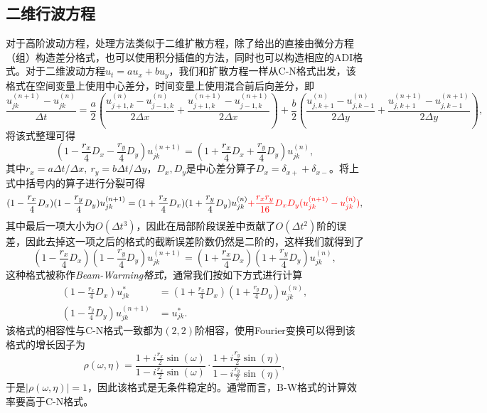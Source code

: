 \documentclass[a4paper,10pt]{ctexart}
\begin{document}
\subsection{二维行波方程}
对于高阶波动方程，处理方法类似于二维扩散方程，除了给出的直接由微分方程（组）构造差分格式，也可以使用积分插值的方法，同时也可以构造相应的ADI格式。对于二维波动方程$ u_{t} = au_{x} + bu_{y} $，我们和扩散方程一样从C-N格式出发，该格式在空间变量上使用中心差分，时间变量上使用混合前后向差分，即
\[
    \frac{u^{(n+1)}_{jk} - u^{(n)}_{jk}}{\Delta t} = \frac{a}{2} \left( \frac{u^{(n)}_{j+1,k}-u^{(n)}_{j-1,k}}{2\Delta x} + \frac{u^{(n+1)}_{j+1,k}-u^{(n+1)}_{j-1,k}}{2\Delta x}\right) + \frac{b}{2} \left( \frac{u^{(n)}_{j,k+1}-u^{(n)}_{j,k-1}}{2\Delta y} + \frac{u^{(n+1)}_{j,k+1}-u^{(n+1)}_{j,k-1}}{2\Delta y}\right),
\]
将该式整理可得
\begin{equation}
    (1 - \frac{r_x}{4}D_x-\frac{r_y}{4}D_y)u^{(n+1)}_{jk} = (1 + \frac{r_x}{4}D_x+\frac{r_y}{4}D_y)u^{(n)}_{jk},
\end{equation}
其中$ r_x = a \Delta t / \Delta x,\ r_y = b \Delta t / \Delta y $，$ D_x,D_y $是中心差分算子$ D_x = \delta_{x+}+\delta_{x-} $。将上式中括号内的算子进行分裂可得
\begin{equation}
    (1-\frac{r_x}{4}D_x)(1-\frac{r_y}{4}D_y)u^{(n+1)}_{jk} = (1+\frac{r_x}{4}D_x)(1+\frac{r_y}{4}D_y)u^{(n)}_{jk} \textcolor{red}{+ \frac{r_x r_y}{16}D_xD_y (u^{(n+1)}_{jk}-u^{(n)}_{jk})},
\end{equation}
其中最后一项大小为$ O(\Delta t^3) $，因此在局部阶段误差中贡献了$ O(\Delta t^2) $阶的误差，因此去掉这一项之后的格式的截断误差阶数仍然是二阶的，这样我们就得到了
\begin{equation}
    (1-\frac{r_x}{4}D_x)(1-\frac{r_y}{4}D_y)u^{(n+1)}_{jk} = (1+\frac{r_x}{4}D_x)(1+\frac{r_y}{4}D_y)u^{(n)}_{jk},
\end{equation}
这种格式被称作\emph{Beam-Warming格式}，通常我们按如下方式进行计算
\begin{equation}
    \begin{aligned}
        (1-\frac{r_x}{4}D_x)u^*_{jk} &= (1+\frac{r_x}{4}D_x)(1+\frac{r_y}{4}D_y)u^{(n)}_{jk},\\
        (1-\frac{r_y}{4}D_y)u^{(n+1)}_{jk} &= u^*_{jk}.
    \end{aligned}
\end{equation}
该格式的相容性与C-N格式一致都为$ (2,2) $阶相容，使用Fourier变换可以得到该格式的增长因子为
\begin{equation}
    \rho(\omega,\eta) = \frac{1+i \frac{r_x}{2}\sin(\omega)}{1-i \frac{r_x}{2}\sin(\omega)}\cdot \frac{1+i \frac{r_y}{2}\sin(\eta)}{1-i \frac{r_y}{2}\sin(\eta)},
\end{equation}
于是$ |\rho(\omega,\eta)|=1 $，因此该格式是无条件稳定的。通常而言，B-W格式的计算效率要高于C-N格式。
\end{document}
